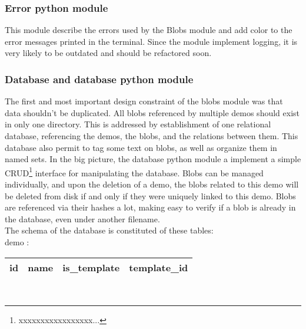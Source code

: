 \subsubsection{Error python module}
This module describe  the errors used  by the Blobs module and add  color to the error messages printed in the terminal. Since the module implement  logging, it is very likely to be outdated and should be refactored soon. 

\subsubsection{Database and database python module}
The first and most important design constraint of the blobs module was that data shouldn't be duplicated. All blobs referenced by multiple demos should exist in only one directory. This is addressed by establishment of one relational database, referencing the demos, the blobs, and the relations  between them. This database also permit  to tag some text on blobs, as well as organize them in named sets. In the big picture, the database python module a implement a simple CRUD\footnote{xxxxxxxxxxxxxxxxx...} interface for manipulating the database. Blobs can be managed individually, and upon the deletion of a demo, the blobs related to this demo will be deleted from disk if and only if they were uniquely linked to this demo. Blobs are referenced via their hashes a lot, making  easy to verify if a blob is already in the database, even under another filename.\\

The schema of the database is constituted of these tables:  \\

demo : 

\begin{tabular}{ | l | l | l | l | }
  \hline
  id & name & is\_template & template\_id \\
  \hline
\end{tabular}\\

